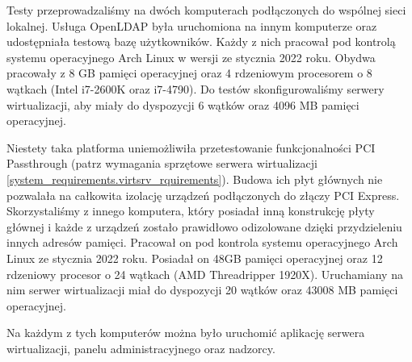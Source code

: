 \documentclass[../analiza-rozwiazania.tex]{subfiles}
\begin{document}
Testy przeprowadzaliśmy na dwóch komputerach podłączonych do wspólnej sieci lokalnej.
Usługa OpenLDAP była uruchomiona na innym komputerze oraz udostępniała testową bazę użytkowników.
Każdy z nich pracował pod kontrolą systemu operacyjnego Arch Linux w wersji ze stycznia 2022 roku.
Obydwa pracowały z 8 GB pamięci operacyjnej oraz 4 rdzeniowym procesorem o 8 wątkach (Intel i7-2600K oraz i7-4790).
Do testów skonfigurowaliśmy serwery wirtualizacji, aby miały do dyspozycji 6 wątków oraz 4096 MB pamięci operacyjnej.

Niestety taka platforma uniemożliwiła przetestowanie funkcjonalności PCI Passthrough (patrz wymagania sprzętowe serwera wirtualizacji \ref{system_requirements.virtsrv_rquirements}).
Budowa ich płyt głównych nie pozwalała na całkowita izolację urządzeń podłączonych do złączy PCI Express.
Skorzystaliśmy z innego komputera, który posiadał inną konstrukcję płyty głównej i każde z urządzeń zostało prawidłowo odizolowane dzięki przydzieleniu innych adresów pamięci.
Pracował on pod kontrola systemu operacyjnego Arch Linux ze stycznia 2022 roku.
Posiadał on 48GB pamięci operacyjnej oraz 12 rdzeniowy procesor o 24 wątkach (AMD Threadripper 1920X).
Uruchamiany na nim serwer wirtualizacji miał do dyspozycji 20 wątków oraz 43008 MB pamięci operacyjnej.

Na każdym z tych komputerów można było uruchomić aplikację serwera wirtualizacji, panelu administracyjnego oraz nadzorcy.
\end{document}
